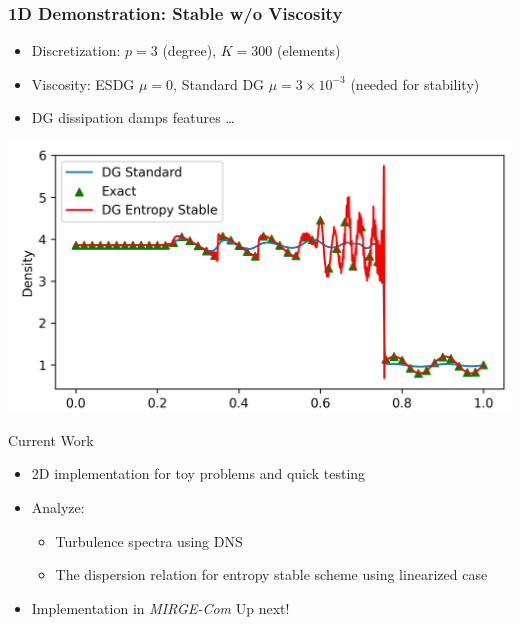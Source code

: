\begin{frame}\frametitle{1D Demonstration:  Stable w/o Viscosity}
	\begin{itemize}
	
		\item Discretization: $p=3$ (degree), $K = 300$ (elements)
		\item Viscosity: ESDG $\mu = 0$, Standard DG $\mu = 3\times 10^{-3}$ (needed for stability)
                \item DG dissipation damps features \ldots
                \end{itemize}
                \medskip
                \begin{center}
                          \includegraphics[width=0.6\linewidth]{figures/RHO.png}          
	\end{center}
        \centerline{}
\end{frame}

\begin{frame}{Current Work}
	\begin{itemize}
		\setlength{\itemsep}{0.2in}
		\item  2D implementation for toy problems and quick testing
		\item Analyze:
		\begin{itemize}
			\item Turbulence spectra using DNS
			\item The dispersion relation for entropy stable scheme using linearized case
		\end{itemize}
		\item  Implementation in \textit{MIRGE-Com} Up next!
	\end{itemize}
      \end{frame}

      


